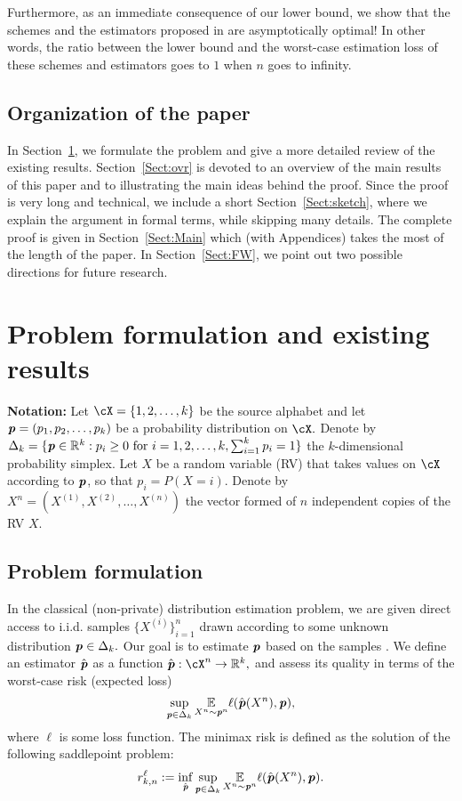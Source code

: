 \documentclass[11pt,onecolumn]{IEEEtran}
\def\mathbi#1{{\textbf{\textit #1}}}
\begin{document}
Furthermore, as an immediate consequence of our lower bound, we show that the schemes and the estimators proposed in \cite{Wang16,Ye17} are asymptotically optimal! In other words, the ratio between
the lower bound and the worst-case estimation loss of these schemes and estimators goes to $1$ when $n$ goes to infinity.

\subsection{Organization of the paper}
In Section~\ref{Sect:pre}, we formulate the problem and give a more detailed review of the existing results.
Section~\ref{Sect:ovr} is devoted to an overview of the main results of this paper and to illustrating the main ideas behind the proof.
Since the proof is very long and technical, we include a short Section~\ref{Sect:sketch}, where
we explain the argument in formal terms, while skipping many details. The complete proof is given in 
Section~\ref{Sect:Main} which (with Appendices) takes the most of the length of the paper.
In Section~\ref{Sect:FW}, we point out two possible directions for future research.


\section{Problem formulation and existing results}\label{Sect:pre}
\textbf{Notation:}
Let $\cX=\{1,2,\dots,k\}$ be the source alphabet and let $\mathbi{p}=(p_1,p_2,\dots,p_k)$ be a probability distribution on $\cX.$
Denote by $\Delta_k=\{\mathbi{p}\in \mathbb{R}^k: p_i\ge 0 \text{~for~} i=1,2,\dots,k, \sum_{i=1}^k p_i=1\}$ the $k$-dimensional probability simplex. Let $X$ be a random variable (RV) that takes values on $\cX$ according to $\mathbi{p}$, so that $p_i=P(X=i).$ Denote by $X^n=(X^{(1)},X^{(2)},\dots,X^{(n)})$ the vector formed of $n$ independent copies of the RV $X.$

\subsection{Problem formulation}
In the classical (non-private) distribution estimation problem, we are given direct access to i.i.d. samples
$\{X^{(i)}\}_{i=1}^n$ drawn according to some unknown distribution $\mathbi{p}\in \Delta_k.$ Our goal is to estimate $\mathbi{p}$ based on the samples \cite{Lehmann06}. We define an estimator $\hat{\mathbi{p}}$ as a function
$\hat{\mathbi{p}}:\cX^n \to \mathbb{R}^k,$ and assess its quality in terms of the worst-case risk (expected loss)
$$
\sup_{\mathbi{p}\in \Delta_k}  \underset{X^n\sim \mathbi{p}^n}{\mathbb{E}} \ell(\hat{\mathbi{p}}(X^n), \mathbi{p}),
$$
where $\ell$ is some loss function. The minimax risk is defined as the solution of the following saddlepoint problem:
$$
r_{k,n}^{\ell}:= \inf_{\hat{\mathbi{p}}} \sup_{\mathbi{p}\in \Delta_k} 
\underset{X^n\sim \mathbi{p}^n}{\mathbb{E}} \ell(\hat{\mathbi{p}}(X^n), \mathbi{p}).
$$
\end{document}
